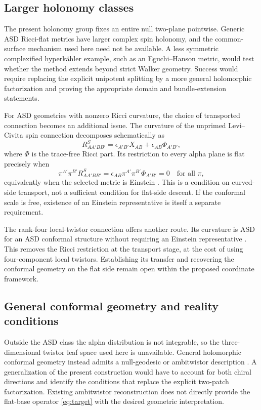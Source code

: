 \documentclass[11pt]{article}
\numberwithin{equation}{section}
\theoremstyle{definition}
\theoremstyle{remark}
\begin{document}
\subsection{Larger holonomy classes}

The present holonomy group fixes an entire null two-plane pointwise. Generic ASD Ricci-flat metrics have larger complex spin holonomy, and the common-surface mechanism used here need not be available. A less symmetric complexified hyperkähler example, such as an Eguchi--Hanson metric, would test whether the method extends beyond strict Walker geometry. Success would require replacing the explicit unipotent splitting by a more general holomorphic factorization and proving the appropriate domain and bundle-extension statements.

For ASD geometries with nonzero Ricci curvature, the choice of transported connection becomes an additional issue. The curvature of the unprimed Levi--Civita spin connection decomposes schematically as
\[
R^S_{AA'BB'}=\epsilon_{A'B'}X_{AB}+\epsilon_{AB}\Phi_{A'B'},
\]
where $\Phi$ is the trace-free Ricci part. Its restriction to every alpha plane is flat precisely when
\[
\pi^{A'}\pi^{B'}R^S_{AA'BB'}
=\epsilon_{AB}\pi^{A'}\pi^{B'}\Phi_{A'B'}=0
\quad\text{for all }\pi,
\]
equivalently when the selected metric is Einstein \cite[Proposition 2.2]{AHS}. This is a condition on curved-side transport, not a sufficient condition for flat-side descent. If the conformal scale is free, existence of an Einstein representative is itself a separate requirement.

The rank-four local-twistor connection offers another route. Its curvature is ASD for an ASD conformal structure without requiring an Einstein representative \cite[Proposition 4.2]{DT}. This removes the Ricci restriction at the transport stage, at the cost of using four-component local twistors. Establishing its transfer and recovering the conformal geometry on the flat side remain open within the proposed coordinate framework.

\subsection{General conformal geometry and reality conditions}

Outside the ASD class the alpha distribution is not integrable, so the three-dimensional twistor leaf space used here is unavailable. General holomorphic conformal geometry instead admits a null-geodesic or ambitwistor description \cite{LeBrun}. A generalization of the present construction would have to account for both chiral directions and identify the conditions that replace the explicit two-patch factorization. Existing ambitwistor reconstruction does not directly provide the flat-base operator \eqref{eq:target} with the desired geometric interpretation.
\end{document}
